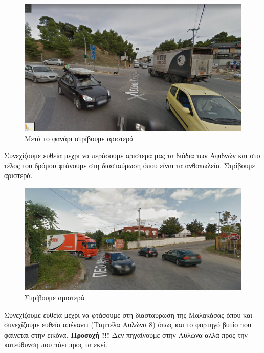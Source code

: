 \begin{figure}[hbp!]
	\centering
		\includegraphics[width=\textwidth]{images/athina-lamia/astefanos/astefanos2.PNG}
			\caption{Μετά το φανάρι στρίβουμε αριστερά}
\end{figure}
\break
Συνεχίζουμε ευθεία μέχρι να περάσουμε αριστερά μας τα διόδια των Αφιδνών και στο τέλος του δρόμου φτάνουμε στη διασταύρωση όπου είναι τα ανθοπωλεία. Στρίβουμε αριστερά.

\begin{figure}[hbp!]
	\centering
		\includegraphics[width=\textwidth]{images/athina-lamia/astefanos/astefanos3.PNG}
			\caption{Στρίβουμε αριστερά}
\end{figure}
Συνεχίζουμε ευθεία μέχρι να φτάσουμε στη διασταύρωση της Μαλακάσας όπου και συνεχίζουμε ευθεία απέναντι (Ταμπέλα Αυλώνα 8) όπως και το φορτηγό βυτίο που φαίνεται στην εικόνα. \textbf{Προσοχή !!!}
Δεν πηγαίνουμε στην Αυλώνα αλλά προς την κατεύθυνση που πάει προς τα εκεί.  

